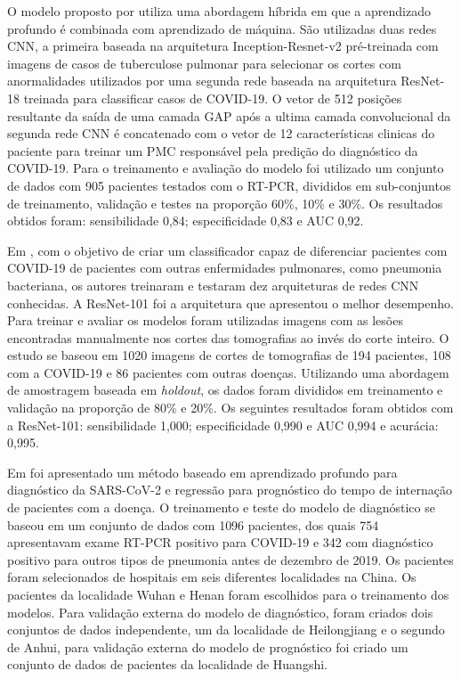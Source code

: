 O modelo proposto por \cite{mei2020artificial} utiliza uma abordagem híbrida em que a aprendizado profundo é combinada com aprendizado de máquina. São utilizadas duas redes CNN, a primeira baseada na arquitetura Inception-Resnet-v2 \cite{szegedy2017inception} pré-treinada com imagens de casos de tuberculose pulmonar para selecionar os cortes com anormalidades utilizados por uma segunda rede baseada na arquitetura ResNet-18 \cite{he2016deep} treinada para classificar casos de COVID-19. O vetor de 512 posições resultante da saída de uma camada GAP após a ultima camada convolucional da segunda rede CNN é concatenado com o vetor de 12 características clinicas do paciente para treinar um PMC responsável pela predição do diagnóstico da COVID-19. Para o treinamento e avaliação do modelo foi utilizado um conjunto de dados com 905 pacientes testados com o RT-PCR, divididos em sub-conjuntos de treinamento, validação e testes na proporção 60\%, 10\% e 30\%. Os resultados obtidos foram: sensibilidade 0,84; especificidade 0,83 e AUC 0,92.

Em \cite{ardakani2020application}, com o objetivo de criar um classificador capaz de diferenciar pacientes com COVID-19 de pacientes com outras enfermidades pulmonares, como pneumonia bacteriana, os autores treinaram e testaram dez arquiteturas de redes CNN conhecidas. A ResNet-101 \cite{he2016deep} foi a arquitetura que apresentou o melhor desempenho. Para treinar e avaliar os modelos foram utilizadas imagens com as lesões encontradas manualmente nos cortes das tomografias ao invés do corte inteiro. O estudo se baseou em 1020 imagens de cortes de tomografias de 194 pacientes, 108 com a COVID-19 e 86 pacientes com outras doenças. Utilizando uma abordagem de amostragem baseada em \textit{holdout}, os dados foram divididos em treinamento e validação na proporção de 80\% e 20\%. Os seguintes resultados foram obtidos com a ResNet-101: sensibilidade 1,000; especificidade 0,990 e AUC 0,994 e  acurácia: 0,995.

Em \cite{wang2020fully} foi apresentado um método baseado em aprendizado profundo para diagnóstico da SARS-CoV-2 e regressão para prognóstico do tempo de internação de pacientes com a doença. O treinamento e teste do modelo de diagnóstico se baseou em um conjunto de dados com 1096 pacientes, dos quais 754 apresentavam exame RT-PCR positivo para COVID-19 e 342 com diagnóstico positivo para outros tipos de pneumonia antes de dezembro de 2019. Os pacientes foram selecionados de hospitais em seis diferentes localidades na China. Os pacientes da localidade Wuhan e Henan foram escolhidos para o treinamento dos modelos. Para validação externa do modelo de diagnóstico, foram criados dois conjuntos de dados independente, um da localidade de Heilongjiang e o segundo de Anhui, para validação externa do modelo de prognóstico foi criado um conjunto de dados de pacientes da localidade de Huangshi.

